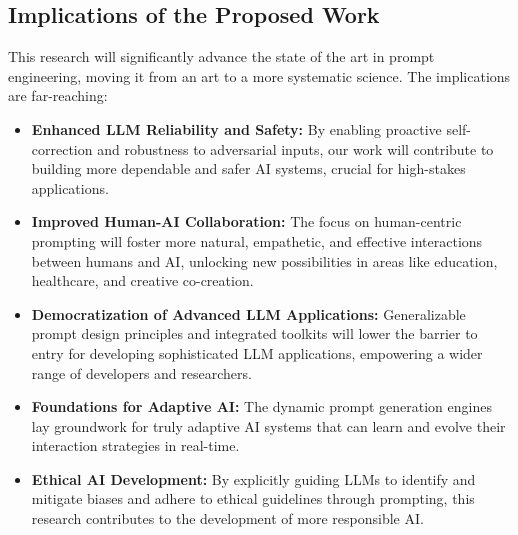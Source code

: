 \documentclass{article}
\begin{document}
\subsection{Implications of the Proposed Work}
This research will significantly advance the state of the art in prompt engineering, moving it from an art to a more systematic science. The implications are far-reaching:
\begin{itemize}[noitemsep]
    \item \textbf{Enhanced LLM Reliability and Safety:} By enabling proactive self-correction and robustness to adversarial inputs, our work will contribute to building more dependable and safer AI systems, crucial for high-stakes applications.
    \item \textbf{Improved Human-AI Collaboration:} The focus on human-centric prompting will foster more natural, empathetic, and effective interactions between humans and AI, unlocking new possibilities in areas like education, healthcare, and creative co-creation.
    \item \textbf{Democratization of Advanced LLM Applications:} Generalizable prompt design principles and integrated toolkits will lower the barrier to entry for developing sophisticated LLM applications, empowering a wider range of developers and researchers.
    \item \textbf{Foundations for Adaptive AI:} The dynamic prompt generation engines lay groundwork for truly adaptive AI systems that can learn and evolve their interaction strategies in real-time.
    \item \textbf{Ethical AI Development:} By explicitly guiding LLMs to identify and mitigate biases and adhere to ethical guidelines through prompting, this research contributes to the development of more responsible AI.
\end{itemize}
\end{document}

